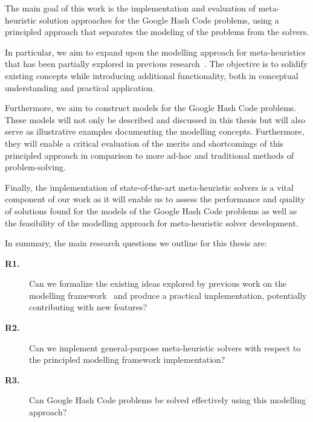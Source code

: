 The main goal of this work is the implementation and evaluation of meta-
heuristic solution approaches for the Google Hash Code problems, using a
principled approach that separates the modeling of the problems from the
solvers.

In particular, we aim to expand upon the modelling approach for meta-heuristics
that has been partially explored in previous
research~\cite{vieira2009uma,fonseca2021nasf4nio,outeiro2021application}. The
objective is to solidify existing concepts while introducing additional
functionality, both in conceptual understanding and practical application.

Furthermore, we aim to construct models for the Google Hash Code problems. These
models will not only be described and discussed in this thesis but will also
serve as illustrative examples documenting the modelling concepts. Furthermore,
they will enable a critical evaluation of the merits and shortcomings of this
principled approach in comparison to more ad-hoc and traditional methods of
problem-solving.

Finally, the implementation of state-of-the-art meta-heuristic solvers is a
vital component of our work as it will enable us to assess the performance and
quality of solutions found for the models of the Google Hash Code problems as
well as the feasibility of the modelling approach for meta-heuristic solver
development.

In summary, the main research questions we outline for this thesis are:

\begin{description}
  \item[\textbf{R1.}] Can we formalize the existing ideas explored by previous
    work on the modelling framework~\cite{vieira2009uma,fonseca2021nasf4nio,outeiro2021application}
    and produce a practical implementation, potentially contributing with new
    features?

  \item[\textbf{R2.}] Can we implement general-purpose meta-heuristic solvers
    with respect to the principled modelling framework implementation?

  \item[\textbf{R3.}] Can Google Hash Code problems be solved effectively using
    this modelling approach?
\end{description}